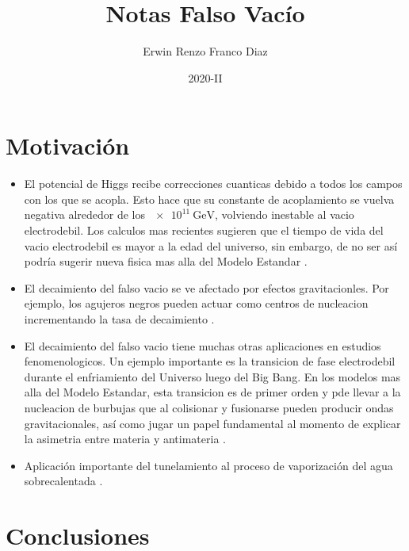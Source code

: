 \documentclass[11pt, a4paper]{article}
\title{Notas Falso Vacío}
\author{Erwin Renzo Franco Diaz}
\date{2020-II}
\numberwithin{equation}{section}
\theoremstyle{definition}
\begin{document}
\maketitle

\section{Motivación}

\begin{itemize}

\item El potencial de Higgs recibe correcciones cuanticas debido a todos los campos con los que se acopla. Esto hace que su constante de acoplamiento se vuelva negativa alrededor de los $\SI{e11}{\giga\electronvolt}$, volviendo inestable al vacio electrodebil. Los calculos mas recientes sugieren que el tiempo de vida del vacio electrodebil es mayor a la edad del universo, sin embargo, de no ser así podría sugerir nueva fisica mas alla del Modelo Estandar \cite{Ai:2019dqr}.

\item El decaimiento del falso vacio se ve afectado por efectos gravitacionles. Por ejemplo, los agujeros negros pueden actuar como centros de nucleacion incrementando la tasa de decaimiento \cite{Ai:2019dqr}.

\item El decaimiento del falso vacio tiene muchas otras aplicaciones en estudios fenomenologicos. Un ejemplo importante es la transicion de fase electrodebil durante el enfriamiento del Universo luego del Big Bang. En los modelos mas alla del Modelo Estandar, esta transicion es de primer orden y pde llevar a la nucleacion de burbujas que al colisionar y fusionarse pueden producir ondas gravitacionales, así como jugar un papel fundamental al momento de explicar la asimetria entre materia y antimateria \cite{Ai:2019dqr}. 

\item Aplicación importante del tunelamiento al proceso de vaporización del agua sobrecalentada  \cite{kleinert2009path}. 

\end{itemize}

\section{Conclusiones}
\end{document}

